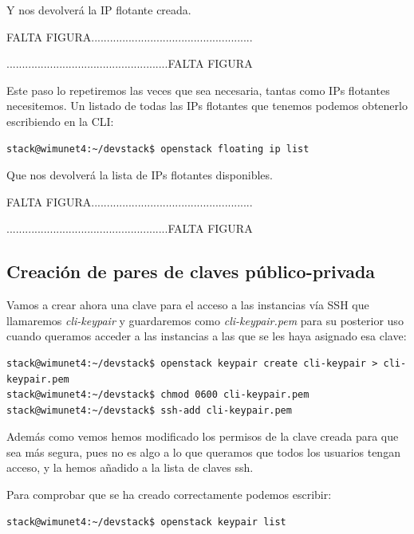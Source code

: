Y nos devolverá la IP flotante creada.

\begin{tcolorbox}[colback=green!5!white,colframe=green!75!black]
FALTA FIGURA....................................................

....................................................FALTA FIGURA
\end{tcolorbox}

Este paso lo repetiremos las veces que sea necesaria, tantas como IPs flotantes necesitemos. Un listado de todas las IPs flotantes que tenemos podemos obtenerlo escribiendo en la CLI:

\begin{lstlisting}[style=Consola]
stack@wimunet4:~/devstack$ openstack floating ip list
\end{lstlisting}

Que nos devolverá la lista de IPs flotantes disponibles.

\begin{tcolorbox}[colback=green!5!white,colframe=green!75!black]
FALTA FIGURA....................................................

....................................................FALTA FIGURA
\end{tcolorbox}

\subsection{Creación de pares de claves público-privada}
Vamos a crear ahora una clave para el acceso a las instancias vía SSH que llamaremos \textit{cli-keypair} y guardaremos como \textit{cli-keypair.pem} para su posterior uso cuando queramos acceder a las instancias a las que se les haya asignado esa clave:

\begin{lstlisting}[style=Consola]
stack@wimunet4:~/devstack$ openstack keypair create cli-keypair > cli-keypair.pem
stack@wimunet4:~/devstack$ chmod 0600 cli-keypair.pem
stack@wimunet4:~/devstack$ ssh-add cli-keypair.pem
\end{lstlisting}

Además como vemos hemos modificado los permisos de la clave creada para que sea más segura, pues no es algo a lo que queramos que todos los usuarios tengan acceso, y la hemos añadido a la lista de claves ssh.

Para comprobar que se ha creado correctamente podemos escribir:
\begin{lstlisting}[style=Consola]
stack@wimunet4:~/devstack$ openstack keypair list
\end{lstlisting}

